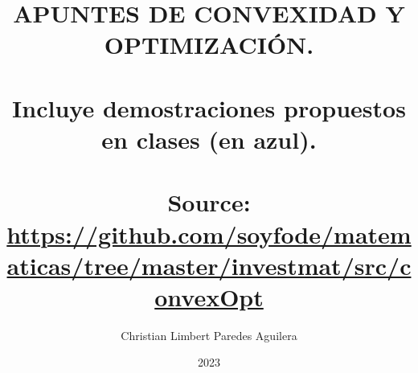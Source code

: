 \title{APUNTES DE CONVEXIDAD Y OPTIMIZACIÓN. \\ \hfill\\ \large  Incluye demostraciones propuestos en clases ({\color{blue}en azul}).\\\hfill \\ \small Source: \url{https://github.com/soyfode/matematicas/tree/master/investmat/src/convexOpt}}
\author{Christian Limbert Paredes Aguilera}
\date{2023}
